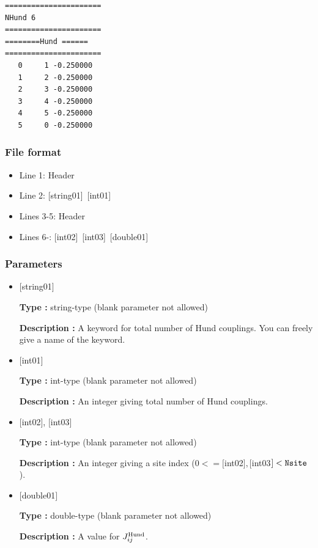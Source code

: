 \begin{minipage}{12.5cm}
\begin{screen}
\begin{verbatim}
====================== 
NHund 6  
====================== 
========Hund ====== 
====================== 
   0     1 -0.250000
   1     2 -0.250000
   2     3 -0.250000
   3     4 -0.250000
   4     5 -0.250000
   5     0 -0.250000
\end{verbatim}
\end{screen}
\end{minipage}

\subsubsection{File format}
 \begin{itemize}
   \item  Line 1:  Header
   \item  Line 2:   [string01]~[int01]
   \item  Lines 3-5:  Header
   \item  Lines 6-: 
   [int02]~[int03]~[double01] 
  \end{itemize}
\subsubsection{Parameters}
 \begin{itemize}

   \item  $[$string01$]$
   
    {\bf Type :} string-type (blank parameter not allowed)

   {\bf Description :}  A keyword for total number of Hund couplings. You can freely give a name of the keyword.

   \item  $[$int01$]$
   
    {\bf Type :} int-type (blank parameter not allowed)

   {\bf Description :} An integer giving total number of Hund couplings.

  \item  $[$int02$]$, $[$int03$]$
  
 {\bf Type :} int-type (blank parameter not allowed)

{\bf Description :} An integer giving a site index ($0<= [$int02$], [$int03$]<\verb|Nsite|$).
 
 \item  $[$double01$]$
   
   {\bf Type :} double-type (blank parameter not allowed)

  {\bf Description :}  A value for $J_{ij}^{\rm Hund}$.
  
\end{itemize}

